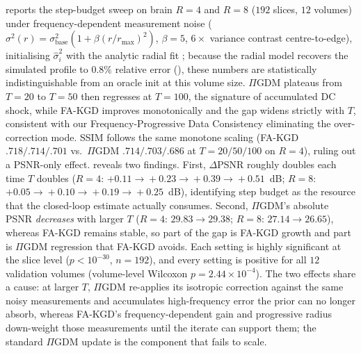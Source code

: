 \documentclass[10pt,twocolumn,letterpaper]{article}
\newcommand{\hatsig}{\hat{\sigma}}
\newcommand{\PIGDM}{$\Pi$GDM}
\begin{document}
 reports the step-budget sweep on brain $R{=}4$ and
$R{=}8$ ($192$ slices, $12$ volumes) under frequency-dependent measurement
noise ($\sigma^2(r)=\sigma_{\text{base}}^2(1+\beta(r/r_{\max})^2)$, $\beta{=}5$,
$6\times$ variance contrast centre-to-edge), initialising $\hatsig_i^2$ with
the analytic radial fit ; because the radial model
recovers the simulated profile to $0.8\%$ relative error (),
these numbers are statistically indistinguishable from an oracle init at this
volume size. \PIGDM{} plateaus from $T{=}20$ to $T{=}50$ then regresses
at $T{=}100$, the signature of
accumulated DC shock, while FA-KGD improves monotonically and the gap widens
strictly with $T$, consistent with our Frequency-Progressive Data Consistency
eliminating the over-correction mode. SSIM follows the same monotone scaling
(FA-KGD $.718/.714/.701$ vs.\ \PIGDM{} $.714/.703/.686$ at $T{=}20/50/100$ on
$R{=}4$), ruling out a PSNR-only effect.
 reveals two findings.
First, $\Delta$PSNR roughly doubles each time $T$ doubles
($R{=}4$: $+0.11\!\to\!+0.23\!\to\!+0.39\!\to\!+0.51$~dB;
$R{=}8$: $+0.05\!\to\!+0.10\!\to\!+0.19\!\to\!+0.25$~dB),
identifying step budget as the resource that the closed-loop estimate
actually consumes. Second, \PIGDM{}'s absolute PSNR \emph{decreases} with
larger $T$ ($R{=}4$: $29.83\!\to\!29.38$; $R{=}8$: $27.14\!\to\!26.65$),
whereas FA-KGD remains stable, so part of the gap is FA-KGD growth and
part is \PIGDM{} regression that FA-KGD avoids. Each setting is highly
significant at the slice level ($p<10^{-30}$, $n{=}192$), and every setting
is positive for all $12$ validation volumes (volume-level Wilcoxon
$p=2.44\times10^{-4}$). The two effects share a cause: at larger $T$,
\PIGDM{} re-applies its isotropic correction against the same noisy
measurements and accumulates high-frequency error the prior can no longer
absorb, whereas FA-KGD's frequency-dependent gain and progressive radius
down-weight those measurements until the iterate can support them; the
standard $\Pi$GDM update is the component that fails to scale.
\end{document}
